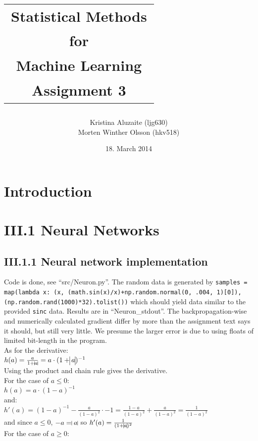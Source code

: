 \documentclass{article}
\title{\begin{tabular}{c}
Statistical Methods\\
for\\
Machine Learning\\
Assignment 3\\
\end{tabular}}
\date{18. March 2014}
\author{\begin{tabular}{c}
Kristina Aluzaite (ljg630)\\
Morten Winther Olsson (hkv518)\\
\end{tabular}}
\theoremstyle{dotless}
\newcounter{min}
\newcommand{\Section}[1]{\section{#1}
\setcounter{min}{1}}
\begin{document}

\maketitle
\thispagestyle{fancy}

\newpage{}



\Section{Introduction}

\Section{III.1 Neural Networks}

\subsection{III.1.1 Neural network implementation}

Code is done, see ``src/Neuron.py''. The random data is generated by \texttt{samples = map(lambda x: (x, (math.sin(x)/x)+np.random.normal(0, .004, 1)[0]), (np.random.rand(1000)*32).tolist())} which should yield data similar to the provided \texttt{sinc} data. Results are in ``Neuron\_stdout''. The backpropagation-wise and numerically calculated gradient differ by more than the assignment text says it should, but still very little. We presume the larger error is due to using floats of limited bit-length in the program.\\

As for the derivative:\\

$h(a)=\frac{a}{1+\vline a\vline}=a\cdot(1+\vline a\vline)^{-1}$\\

Using the product and chain rule gives the derivative.\\

For the case of $a\leq 0$:\\

$h(a)=a\cdot(1-a)^{-1}$\\

and:\\

$h'(a)=(1-a)^{-1}-\frac{a}{(1-a)^2}\cdot -1=\frac{1-a}{(1-a)^2}+\frac{a}{(1-a)^2}=\frac{1}{(1-a)^2}$\\

and since $a\leq 0$, $-a=\vline a\vline$ so $h'(a)=\frac{1}{(1+\vline a\vline)^2}$\\

For the case of $a\geq 0$:\\
\end{document}
